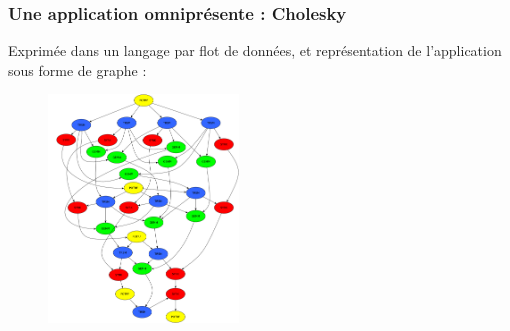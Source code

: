 \documentclass[xcolor={usenames,dvipsnames,svgnames,table}, aspectratio=43]{beamer}
\begin{document}
\begin{frame}
\frametitle{Une application omniprésente : Cholesky}

Exprimée dans un langage par flot de données, et représentation de l'application sous forme de graphe :
\begin{figure}
  \includegraphics[width=0.45\textwidth]{graph/cholesky-dag-5.pdf}
\end{figure}


\end{frame}
\end{document}
